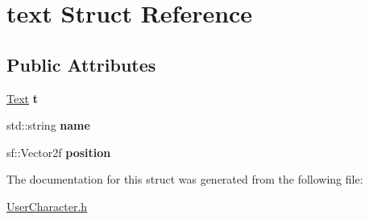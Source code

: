 \hypertarget{structtext}{}\section{text Struct Reference}
\label{structtext}
\subsection*{Public Attributes}
\begin{DoxyCompactItemize}
\item 
\hypertarget{structtext_aebd1edf8aecc3030b4c2262415bee0eb}{}\hyperlink{class_text}{Text} {\bfseries t}\label{structtext_aebd1edf8aecc3030b4c2262415bee0eb}

\item 
\hypertarget{structtext_a35d8e0279c86a715f850d4e970110df2}{}std\+::string {\bfseries name}\label{structtext_a35d8e0279c86a715f850d4e970110df2}

\item 
\hypertarget{structtext_a6450ce253509505020548f928d5c54af}{}sf\+::\+Vector2f {\bfseries position}\label{structtext_a6450ce253509505020548f928d5c54af}

\end{DoxyCompactItemize}


The documentation for this struct was generated from the following file\+:\begin{DoxyCompactItemize}
\item 
\hyperlink{_user_character_8h}{User\+Character.\+h}\end{DoxyCompactItemize}
